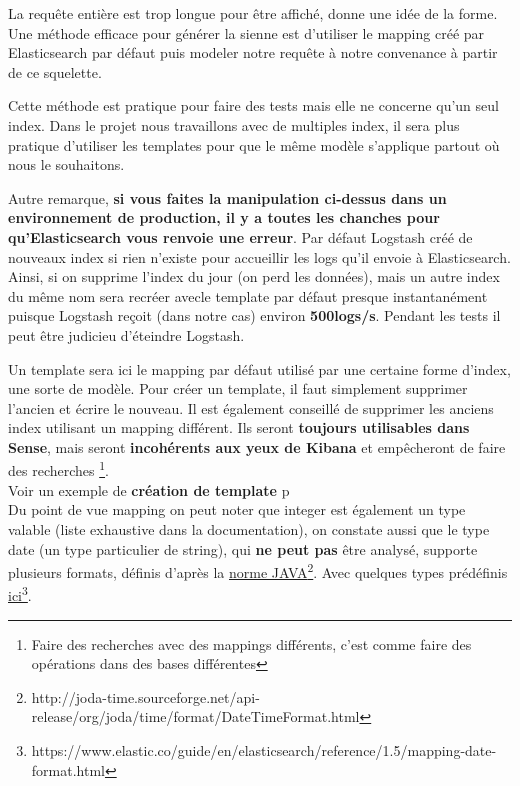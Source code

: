 {La requête entière est trop longue pour être affiché, donne une idée de la forme.
Une méthode efficace pour générer la sienne est d'utiliser le mapping créé par Elasticsearch
par défaut puis modeler notre requête à notre convenance à partir de ce squelette.

Cette méthode est pratique pour faire des tests mais elle ne concerne qu'un seul 
index. Dans le projet nous travaillons avec de multiples index, il sera plus pratique
d'utiliser les templates pour que le même modèle s'applique partout où nous le souhaitons.

Autre remarque, \textbf{si vous faites la manipulation ci-dessus dans un environnement de 
production, il y a toutes les chanches pour qu'Elasticsearch vous renvoie une erreur}.
Par défaut Logstash créé de nouveaux index si rien n'existe pour accueillir les logs qu'il envoie à Elasticsearch. Ainsi, si on supprime l'index du jour (on perd les données), mais un autre index du même nom sera recréer avecle template par défaut presque 
instantanément puisque Logstash reçoit (dans notre cas) environ \textbf{500logs/s}. 
Pendant les tests il peut être judicieu d'éteindre Logstash.


Un template sera ici le mapping par défaut utilisé par une certaine forme d'index, une sorte de modèle.
Pour créer un template, il faut simplement supprimer l'ancien et écrire le nouveau.
Il est également conseillé de supprimer les anciens index utilisant un mapping 
différent. Ils seront \textbf{toujours utilisables dans Sense}, mais seront 
\textbf{incohérents aux yeux de Kibana} et empêcheront de faire des recherches
\footnote{Faire des recherches avec des mappings différents, c'est comme faire des opérations dans des bases différentes}.\\[2mm]


Voir un exemple de \textbf{création de template} p\pageref{lst:mappingput2}\\[2mm]

Du point de vue mapping on peut noter que integer est également un type valable (liste 
exhaustive dans la documentation), on constate aussi que le type date (un type particulier
de string), qui \textbf{ne peut pas} être analysé, supporte plusieurs formats, définis
d'après la \hyperref[http://joda-time.sourceforge.net/api-release/org/joda/time/format/DateTimeFormat.html]{norme JAVA}\footnote{http://joda-time.sourceforge.net/api-release/org/joda/time/format/DateTimeFormat.html}.
Avec quelques types prédéfinis \hyperref[https://www.elastic.co/guide/en/elasticsearch/reference/1.5/mapping-date-format.html]{ici}\footnote{https://www.elastic.co/guide/en/elasticsearch/reference/1.5/mapping-date-format.html}.


}
